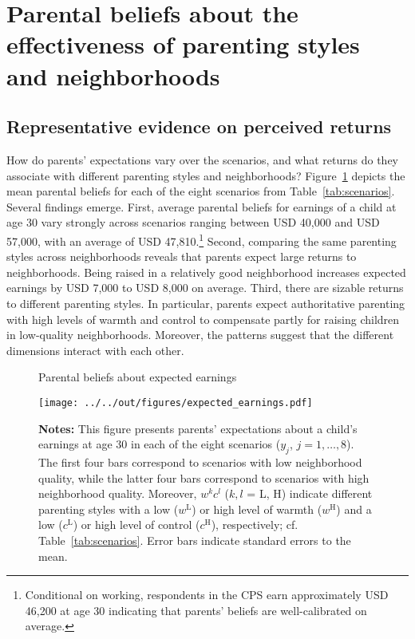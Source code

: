 \documentclass[12pt, a4paper, english]{article}
\begin{document}
\section{Parental beliefs about the effectiveness of parenting styles and neighborhoods}\label{sec:results}
\subsection{Representative evidence on perceived returns}\label{sec:averagebeliefs}
How do parents' expectations vary over the scenarios, and what returns do they associate with different parenting styles and neighborhoods? Figure~\ref{fig:mainresults} depicts the mean parental beliefs for each of the eight scenarios from Table~\ref{tab:scenarios}. Several findings emerge. First, average parental beliefs for earnings of a child at age 30 vary strongly across scenarios ranging between USD 40,000 and USD 57,000, with an average of USD 47,810.\footnote{Conditional on working, respondents in the CPS earn approximately USD 46,200 at age 30 indicating that parents' beliefs are well-calibrated on average.} Second, comparing the same parenting styles across neighborhoods reveals that parents expect large returns to neighborhoods. Being raised in a relatively good neighborhood increases expected earnings by USD 7,000 to USD 8,000 on average. Third, there are sizable returns to different parenting styles. In particular, parents expect authoritative parenting with high levels of warmth and control to compensate partly for raising children in low-quality neighborhoods. Moreover, the patterns suggest that the different dimensions interact with each other.

\begin{figure}[h!]
    \caption{Parental beliefs about expected earnings}\centering\label{fig:mainresults} 
    \texttt{[image: ../../out/figures/expected\_earnings.pdf]} 
    \caption*{\footnotesize \textbf{Notes:} This figure presents parents' expectations about a child's earnings at age 30 in each of the eight scenarios ($y_j$, $j=1,\ldots,8$). The first four bars correspond to scenarios with low neighborhood quality, while the latter four bars correspond to scenarios with high neighborhood quality. Moreover, $w^k c^l$ ($k,l$ = L, H) indicate different parenting styles with a low ($w^{\text{L}}$) or high level of warmth ($w^{\text{H}}$) and a low ($c^{\text{L}}$) or high level of control ($c^{\text{H}}$), respectively; cf. Table~\ref{tab:scenarios}. Error bars indicate standard errors to the mean.}
\end{figure}
\end{document}
